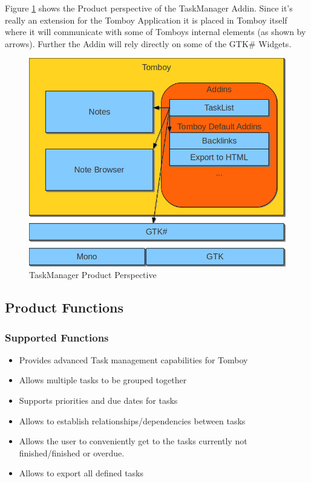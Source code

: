   Figure \ref{perspective} shows the Product perspective of the TaskManager Addin. Since it's really an extension for the Tomboy Application it is placed in Tomboy itself where it will communicate with some of Tomboys internal elements (as shown by arrows). Further the Addin will rely directly on some of the GTK\# Widgets.
  \begin{figure}[ht]
    \includegraphics[width=\textwidth]{graphics/product_perspective_diagram.png}
    \caption{TaskManager Product Perspective}
    \label{perspective}
  \end{figure}


\subsection{Product Functions}
\label{description:functions}

  \subsubsection*{Supported Functions}
  \label{description:functions:supported}

    \begin{itemize}
      \item Provides advanced Task management capabilities for Tomboy
      \item Allows multiple tasks to be grouped together
      \item Supports priorities and due dates for tasks
      \item Allows to establish relationships/dependencies between tasks
      \item Allows the user to conveniently get to the tasks currently not finished/finished or overdue.
      \item Allows to export all defined tasks
    \end{itemize}

